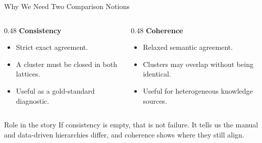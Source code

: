 \begin{frame}{Why We Need Two Comparison Notions}
\begin{columns}[T,onlytextwidth]
\begin{column}{0.48\textwidth}
\textbf{Consistency}
\begin{itemize}
    \item Strict exact agreement.
    \item A cluster must be closed in both lattices.
    \item Useful as a gold-standard diagnostic.
\end{itemize}
\end{column}
\begin{column}{0.48\textwidth}
\textbf{Coherence}
\begin{itemize}
    \item Relaxed semantic agreement.
    \item Clusters may overlap without being identical.
    \item Useful for heterogeneous knowledge sources.
\end{itemize}
\end{column}
\end{columns}

\vspace{0.5em}
\begin{block}{Role in the story}
If consistency is empty, that is not failure. It tells us the manual and data-driven hierarchies differ, and coherence shows where they still align.
\end{block}
\end{frame}
